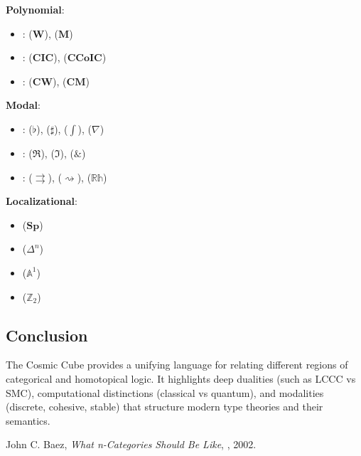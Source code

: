 \documentclass{article}
\begin{document}
\noindent \textbf{Polynomial}:
\begin{itemize}
\item {}:  ($\mathbf{W}$),  ($\mathbf{M}$)
\item {}:  ($\mathbf{CIC}$),  ($\mathbf{CCoIC}$)
\item {}:  ($\mathbf{CW}$),  ($\mathbf{CM}$)
\end{itemize}

\noindent \textbf{Modal}:
\begin{itemize}
\item {}:  ($\flat$),  ($\sharp$),  ($\int$),  ($\nabla$)
\item {}:  ($\Re$),  ($\Im$),  ($\&$)
\item {}:  ($\rightrightarrows$),  ($\rightsquigarrow$),  ($\mathbb{Rh}$)
\end{itemize}

\noindent \textbf{Localizational}:
\begin{itemize}
\item {} ($\mathbf{Sp}$)
\item {} ($\mathbb{\Delta}^n$)
\item {} ($\mathbb{A}^1$)
\item {} ($\mathbb{Z}_2$)
\end{itemize}

\subsection{Conclusion}
The Cosmic Cube provides a unifying language for relating different regions
of categorical and homotopical logic. It highlights deep dualities (such as
LCCC vs SMC), computational distinctions (classical vs quantum),
and modalities (discrete, cohesive, stable) that structure modern
type theories and their semantics.

\begin{thebibliography}{9}
 John C. Baez, \emph{What n-Categories Should Be Like}, , 2002.
\end{thebibliography}
\end{document}
